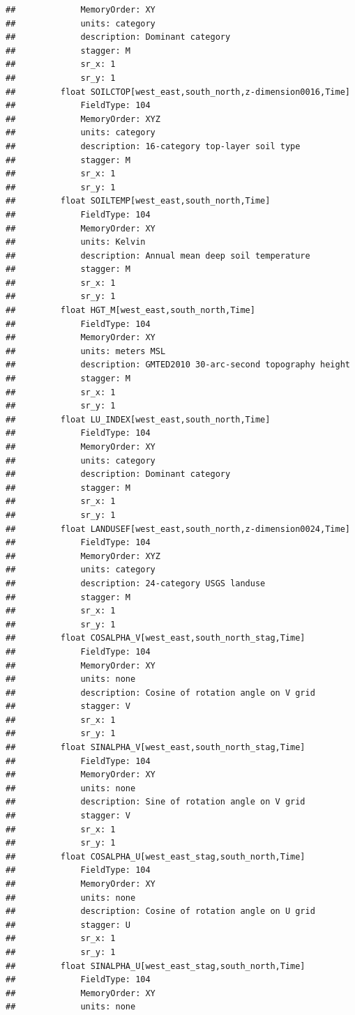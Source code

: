 \documentclass[]{book}
\begin{document}
\begin{verbatim}
##             MemoryOrder: XY 
##             units: category
##             description: Dominant category
##             stagger: M
##             sr_x: 1
##             sr_y: 1
##         float SOILCTOP[west_east,south_north,z-dimension0016,Time]   
##             FieldType: 104
##             MemoryOrder: XYZ
##             units: category
##             description: 16-category top-layer soil type
##             stagger: M
##             sr_x: 1
##             sr_y: 1
##         float SOILTEMP[west_east,south_north,Time]   
##             FieldType: 104
##             MemoryOrder: XY 
##             units: Kelvin
##             description: Annual mean deep soil temperature
##             stagger: M
##             sr_x: 1
##             sr_y: 1
##         float HGT_M[west_east,south_north,Time]   
##             FieldType: 104
##             MemoryOrder: XY 
##             units: meters MSL
##             description: GMTED2010 30-arc-second topography height
##             stagger: M
##             sr_x: 1
##             sr_y: 1
##         float LU_INDEX[west_east,south_north,Time]   
##             FieldType: 104
##             MemoryOrder: XY 
##             units: category
##             description: Dominant category
##             stagger: M
##             sr_x: 1
##             sr_y: 1
##         float LANDUSEF[west_east,south_north,z-dimension0024,Time]   
##             FieldType: 104
##             MemoryOrder: XYZ
##             units: category
##             description: 24-category USGS landuse
##             stagger: M
##             sr_x: 1
##             sr_y: 1
##         float COSALPHA_V[west_east,south_north_stag,Time]   
##             FieldType: 104
##             MemoryOrder: XY 
##             units: none
##             description: Cosine of rotation angle on V grid
##             stagger: V
##             sr_x: 1
##             sr_y: 1
##         float SINALPHA_V[west_east,south_north_stag,Time]   
##             FieldType: 104
##             MemoryOrder: XY 
##             units: none
##             description: Sine of rotation angle on V grid
##             stagger: V
##             sr_x: 1
##             sr_y: 1
##         float COSALPHA_U[west_east_stag,south_north,Time]   
##             FieldType: 104
##             MemoryOrder: XY 
##             units: none
##             description: Cosine of rotation angle on U grid
##             stagger: U
##             sr_x: 1
##             sr_y: 1
##         float SINALPHA_U[west_east_stag,south_north,Time]   
##             FieldType: 104
##             MemoryOrder: XY 
##             units: none

\end{verbatim}
\end{document}
